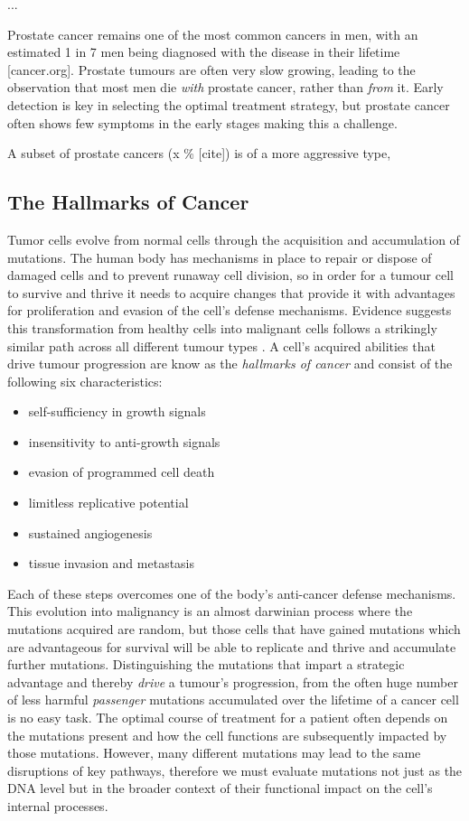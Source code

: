 ...

Prostate cancer remains one of the most common cancers in men, with an estimated 1 in 7 men being diagnosed with the disease in their lifetime \cite{}[cancer.org]. Prostate tumours are often very slow growing, leading to the observation that most men die \emph{with} prostate cancer, rather than \emph{from} it. Early detection is key in selecting the optimal treatment strategy, but prostate cancer often shows few symptoms in the early stages making this a challenge.

A subset of prostate cancers (x \% [cite]) is of a more aggressive type,


\subsection{The Hallmarks of Cancer}

Tumor cells evolve from normal cells through the acquisition and accumulation of mutations. The human body has mechanisms in place to repair or dispose of damaged cells and to prevent runaway cell division, so in order for a tumour cell to survive and thrive it needs to acquire changes that provide it with advantages for proliferation and evasion of the cell's defense mechanisms. Evidence suggests this transformation from healthy cells into malignant cells follows a strikingly similar path across all different tumour types \cite{}. A cell's acquired abilities that drive tumour progression are know as the \emph{hallmarks of cancer} and consist of the following six characteristics:

\begin{itemize}
    \itemsep-0.5em
    \item self-sufficiency in growth signals
    \item insensitivity to anti-growth signals
    \item evasion of programmed cell death
    \item limitless replicative potential
    \item sustained angiogenesis
    \item tissue invasion and metastasis
\end{itemize}

Each of these steps overcomes one of the body's anti-cancer defense mechanisms. This evolution into malignancy is an almost darwinian process where the mutations acquired are random, but those cells that have gained mutations which are advantageous for survival will be able to replicate and thrive and accumulate further mutations. Distinguishing the mutations that impart a strategic advantage and thereby \emph{drive} a tumour's progression, from the often huge number of less harmful \emph{passenger} mutations accumulated over the lifetime of a cancer cell is no easy task. The optimal course of treatment for a patient often depends on the mutations present and how the cell functions are subsequently impacted by those mutations. However, many different mutations may lead to the same disruptions of key pathways, therefore we must evaluate mutations not just as the DNA level but in the broader context of their functional impact on the cell's internal processes.


